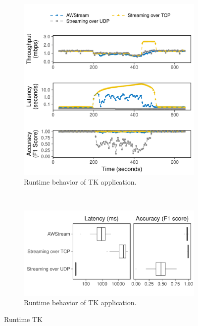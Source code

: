 \begin{figure}
  \begin{subfigure}[t]{\columnwidth}
    \centering
    \includegraphics[width=\columnwidth]{figures/runtime_tk-timeseries.pdf}
    \caption{Runtime behavior of TK application.}
    \label{fig:tk-runtime-timeseries}
  \end{subfigure}
  \vspace{1em}
  \\
  \begin{subfigure}[t]{\columnwidth}
    \centering
    \includegraphics[width=\columnwidth]{figures/runtime_tk-boxplot.pdf}
    \caption{Runtime behavior of TK application.}
    \label{fig:tk-runtime-boxplot}
  \end{subfigure}
  \caption{Runtime TK}
  \label{fig:tk-runtime}
\end{figure}

